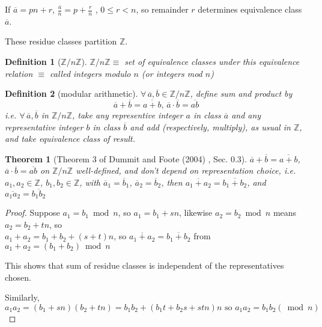 \documentclass[10pt]{amsart}
\newtheorem{theorem}{Theorem}
\newtheorem{definition}{Definition}
\begin{document}
\begin{multicols*}{2}
If $\overline{a} = pn +r$, $\frac{ \overline{a}}{n} = p + \frac{r}{n}$ , $0\leq r < n$, so remainder $r$ determines equivalence class $\overline{a}$.

These residue classes partition $\mathbb{Z}$. 
\begin{definition}[$\mathbb{Z} / n \mathbb{Z}$]
$\mathbb{Z} / n\mathbb{Z} \equiv$ set of equivalence classes under this equivalence relation $\equiv$ called integers modulo $n$ (or integers mod $n$)
\end{definition} 

\begin{definition}[modular arithmetic]
	$\forall \, \overline{a}, \overline{b} \in \mathbb{Z} / n \mathbb{Z}$, define sum and product by 
	\begin{equation}
	\overline{a} + \overline{b} = \overline{a+b}, \, \overline{a} \cdot \overline{b} = \overline{ab}
	\end{equation}
	i.e. $\forall \, \overline{a}, \overline{b}$ in $\mathbb{Z}/n\mathbb{Z}$, take \emph{any representive} integer $a$ in class $\overline{a}$ and \emph{any representative} integer $b$ in class $\overline{b}$ and add (respectively, multiply), as usual in $\mathbb{Z}$, and take equivalence class of result.
\end{definition}

\begin{theorem}[Theorem 3 of Dummit and Foote (2004) \cite{DuFo2003}, Sec. 0.3]
	$\overline{a} + \overline{b} = \overline{a+b}$, $\overline{a} \cdot \overline{b} = \overline{ab}$ on $\mathbb{Z}/n\mathbb{Z}$ well-defined, and don't depend on representation choice, i.e. $a_1, a_2 \in \mathbb{Z}$, $b_1, b_2 \in \mathbb{Z}$, with $\overline{a}_1 = \overline{b}_1$, $\overline{a}_2 = \overline{b}_2$, then $\overline{a_1 + a_2} = \overline{b_1 + b_2}$, and $\overline{a_1 a_2} = \overline{b_1 b_2}$
\end{theorem} 

\begin{proof}
	Suppose $a_1 = b_1 \bmod{n}$, so $a_1 = b_1 + sn$, likewise $a_2 = b_2 \bmod{n}$ means $a_2 = b_2 + tn$, so \\
	$a_1 + a_2 = b_1 + b_2 + (s+t)n$, so $\overline{a_1 + a_2} = \overline{b_1 + b_2}$ from $a_1 + a_2 = (b_1 + b_2) \bmod{n}$

This shows that sum of residue classes is independent of the representatives chosen.

Similarly, 
\[
a_1 a_2 = (b_1 + sn) (b_2 + tn) = b_1 b_2 + (b_1 t + b_2 s + stn) n \text{ so } a_1 a_2 = b_1b_2(\bmod{n})
\]


\end{proof}
\end{multicols*}
\end{document}
